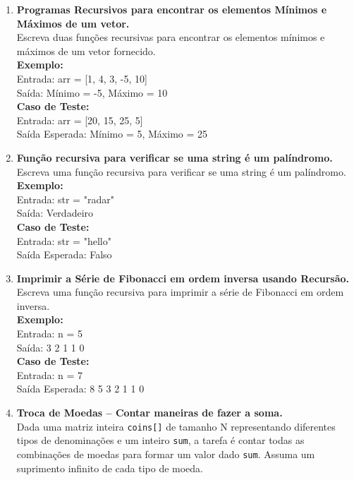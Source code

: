 \documentclass[12pt]{article}
\begin{document}
\begin{enumerate}
    \item \textbf{Programas Recursivos para encontrar os elementos Mínimos e Máximos de um vetor.} \\
    Escreva duas funções recursivas para encontrar os elementos mínimos e máximos de um vetor fornecido. \\
    \textbf{Exemplo:} \\
    Entrada: arr = [1, 4, 3, -5, 10] \\
    Saída: Mínimo = -5, Máximo = 10 \\
    \textbf{Caso de Teste:} \\
    Entrada: arr = [20, 15, 25, 5] \\
    Saída Esperada: Mínimo = 5, Máximo = 25
    
    \item \textbf{Função recursiva para verificar se uma string é um palíndromo.} \\
    Escreva uma função recursiva para verificar se uma string é um palíndromo. \\
    \textbf{Exemplo:} \\
    Entrada: str = "radar" \\
    Saída: Verdadeiro \\
    \textbf{Caso de Teste:} \\
    Entrada: str = "hello" \\
    Saída Esperada: Falso
    
    \item \textbf{Imprimir a Série de Fibonacci em ordem inversa usando Recursão.} \\
    Escreva uma função recursiva para imprimir a série de Fibonacci em ordem inversa. \\
    \textbf{Exemplo:} \\
    Entrada: n = 5 \\
    Saída: 3 2 1 1 0 \\
    \textbf{Caso de Teste:} \\
    Entrada: n = 7 \\
    Saída Esperada: 8 5 3 2 1 1 0
    
    \item \textbf{Troca de Moedas – Contar maneiras de fazer a soma.} \\
    Dada uma matriz inteira \texttt{coins[]} de tamanho N representando diferentes tipos de denominações e um inteiro \texttt{sum}, a tarefa é contar todas as combinações de moedas para formar um valor dado \texttt{sum}. Assuma um suprimento infinito de cada tipo de moeda.
    

\end{enumerate}
\end{document}

